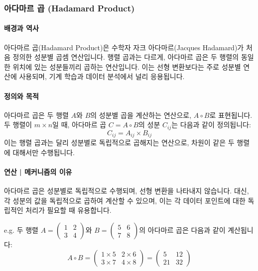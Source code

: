 \subsubsection{아다마르 곱 (Hadamard Product)}

\paragraph{배경과 역사}
아다마르 곱(Hadamard Product)은 수학자 자크 아다마르(Jacques Hadamard)가 처음 정의한 성분별 곱셈 연산입니다. 행렬 곱과는 다르게, 아다마르 곱은 두 행렬의 동일한 위치에 있는 성분들끼리 곱하는 연산입니다. 이는 선형 변환보다는 주로 성분별 연산에 사용되며, 기계 학습과 데이터 분석에서 널리 응용됩니다.

\paragraph{정의와 목적}
아다마르 곱은 두 행렬 \( A \)와 \( B \)의 성분별 곱을 계산하는 연산으로, \( A \circ B \)로 표현됩니다. 두 행렬이 \( m \times n \)일 때, 아다마르 곱 \( C = A \circ B \)의 성분 \( C_{ij} \)는 다음과 같이 정의됩니다:
\[
  C_{ij} = A_{ij} \times B_{ij}
\]
이는 행렬 곱과는 달리 성분별로 독립적으로 곱해지는 연산으로, 차원이 같은 두 행렬에 대해서만 수행됩니다.

\paragraph{연산 | 메커니즘의 이유}
아다마르 곱은 성분별로 독립적으로 수행되며, 선형 변환을 나타내지 않습니다. 대신, 각 성분의 값을 독립적으로 곱하여 계산할 수 있으며, 이는 각 데이터 포인트에 대한 독립적인 처리가 필요할 때 유용합니다.

\vspace{1\baselineskip}
\noindent {} e.g. 두 행렬 \( A = \begin{pmatrix} 1 & 2 \\ 3 & 4 \end{pmatrix} \)와 \( B = \begin{pmatrix} 5 & 6 \\ 7 & 8 \end{pmatrix} \)의 아다마르 곱은 다음과 같이 계산됩니다:
\[
  A \circ B = \begin{pmatrix} 1 \times 5 & 2 \times 6 \\ 3 \times 7 & 4 \times 8 \end{pmatrix} = \begin{pmatrix} 5 & 12 \\ 21 & 32 \end{pmatrix}
\]


